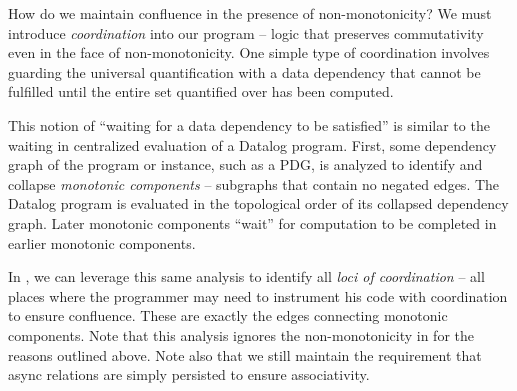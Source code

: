 How do we maintain confluence in the presence of non-monotonicity?  We must
introduce {\em coordination} into our program -- logic that preserves
commutativity even in the face of non-monotonicity.  One simple type of
coordination involves guarding the universal quantification with a data
dependency that cannot be fulfilled until the entire set quantified over has
been computed.

This notion of ``waiting for a data dependency to be satisfied'' is similar to
the waiting in centralized evaluation of a Datalog program.  First, some
dependency graph of the program or instance, such as a PDG, is analyzed to
identify and collapse {\em monotonic components} -- subgraphs that contain no
negated edges.  The Datalog program is evaluated in the topological order of
its collapsed dependency graph.  Later monotonic components ``wait'' for
computation to be completed in earlier monotonic components.  

In \lang, we can leverage this same analysis to identify all {\em loci of
coordination} -- all places where the programmer may need to instrument his code
with coordination to ensure confluence.  These are exactly the edges connecting
monotonic components.  Note that this analysis ignores the non-monotonicity in
 for the reasons outlined above.  Note also that we still
maintain the requirement that async relations are simply persisted to ensure
associativity. 





